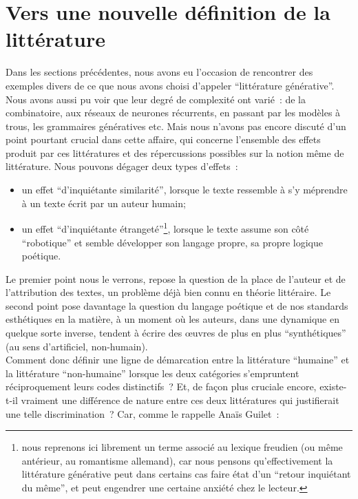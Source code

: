 \documentclass{article}
\begin{document}
	\section{Vers une nouvelle définition de la littérature}\label{nouvelle_definition}
		Dans les sections précédentes, nous avons eu l'occasion de rencontrer des exemples divers de ce que nous avons choisi d'appeler  ``littérature générative''. Nous avons aussi pu voir que leur degré de complexité ont varié~: de la combinatoire, aux réseaux de neurones récurrents, en passant par les modèles à trous, les grammaires génératives etc.
		Mais nous n'avons pas encore discuté d'un point pourtant crucial dans cette affaire, qui concerne l'ensemble des effets produit par ces littératures et des répercussions possibles sur la notion même de littérature. Nous pouvons dégager deux types d'effets~:
		\vspace{2mm}
		\begin{itemize}
			\item un effet ``d'inquiétante similarité'', lorsque le texte ressemble à s'y méprendre à un texte écrit par un auteur humain;
			\item un effet ``d'inquiétante étrangeté''\footnote{nous reprenons ici librement un terme associé au lexique freudien (ou même antérieur, au romantisme allemand), car nous pensons qu'effectivement la littérature générative peut dans certains cas faire état d'un ``retour inquiétant du même'', et peut engendrer une certaine anxiété chez le lecteur.}, lorsque le texte assume son côté ``robotique'' et semble développer son langage propre, sa propre logique poétique.
		\end{itemize}
		\vspace{2mm}
		Le premier point nous le verrons, repose la question de la place de l'auteur et de l'attribution des textes, un problème déjà bien connu en théorie littéraire. Le second point pose davantage la question du langage poétique et de nos standards esthétiques en la matière, à un moment où les auteurs, dans une dynamique en quelque sorte inverse, tendent à écrire des œuvres de plus en plus ``synthétiques'' (au sens d'artificiel, non-humain).\\
		Comment donc définir une ligne de démarcation entre la littérature ``humaine'' et la littérature ``non-humaine'' lorsque les deux catégories s'empruntent réciproquement leurs codes distinctifs ? Et, de façon plus cruciale encore, existe-t-il vraiment une différence de nature entre ces deux littératures qui justifierait une telle discrimination ? Car, comme le rappelle Anaïs Guilet~:
\end{document}
